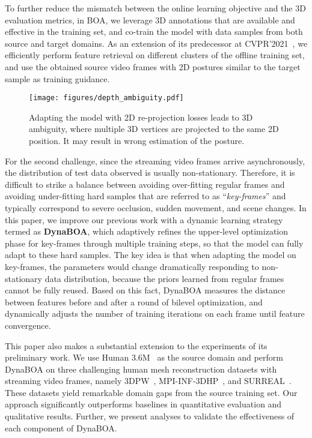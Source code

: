 \documentclass[10pt,journal,compsoc]{IEEEtran}
\let\MYoriglatexcaption\caption
\renewcommand{\caption}[2][\relax]{\MYoriglatexcaption[#2]{#2}}
\begin{document}
To further reduce the mismatch between the online learning objective and the 3D evaluation metrics, in BOA, we leverage 3D annotations that are available and effective in the training set, and co-train the model with data samples from both source and target domains. As an extension of its predecessor at CVPR’2021~\cite{guan2021bilevel}, we efficiently perform feature retrieval on different clusters of the offline training set, and use the obtained source video frames with 2D postures similar to the target sample as training guidance.





\begin{figure}[t]
    \centering
    \texttt{[image: figures/depth\_ambiguity.pdf]}
    \caption{Adapting the model with 2D re-projection losses leads to 3D ambiguity, where multiple 3D vertices are projected to the same 2D position. It may result in wrong estimation of the posture.}
    \label{fig:motivation}
    \vspace{-5pt}
\end{figure}



For the second challenge, since the streaming video frames arrive asynchronously, the distribution of test data observed is usually non-stationary.
Therefore, it is difficult to strike a balance between avoiding over-fitting regular frames and avoiding under-fitting hard samples that are referred to as ``\textit{key-frames}'' and typically correspond to severe occlusion, sudden movement, and scene changes.
In this paper, we improve our previous work with a dynamic learning strategy termed as \textbf{DynaBOA}, which adaptively refines the upper-level optimization phase for key-frames through multiple training steps, so that the model can fully adapt to these hard samples.
The key idea is that when adapting the model on key-frames, the parameters would change dramatically responding to non-stationary data distribution, because the priors learned from regular frames cannot be fully reused.
Based on this fact, DynaBOA measures the distance between features before and after a round of bilevel optimization, and dynamically adjusts the number of training iterations on each frame until feature convergence.



This paper also makes a substantial extension to the experiments of its preliminary work.
We use Human 3.6M~\cite{h36m_pami} as the source domain and perform DynaBOA on three challenging human mesh reconstruction datasets with streaming video frames, namely 3DPW~\cite{vonMarcard2018}, MPI-INF-3DHP~\cite{mehta2017monocular}, and SURREAL~\cite{varol2017learning}. These datasets yield remarkable domain gaps from the source training set. 
Our approach significantly outperforms baselines in quantitative evaluation and qualitative results.
Further, we present analyses to validate the effectiveness of each component of DynaBOA.
\end{document}
